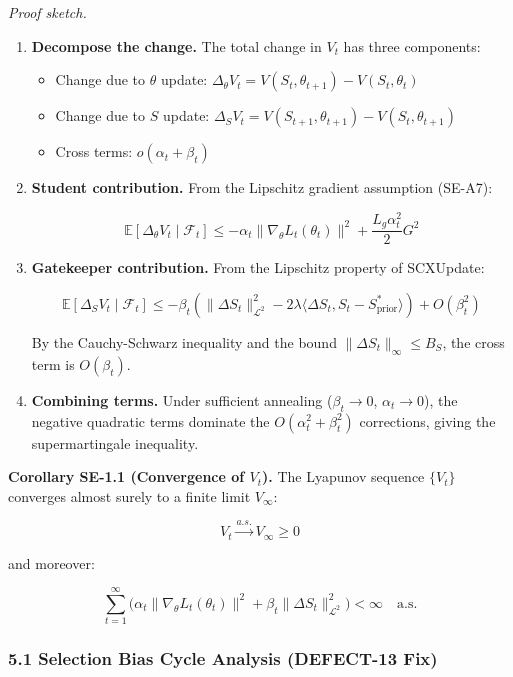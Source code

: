 \documentclass[
  12pt,
]{article}
\providecommand{\tightlist}{%
  \setlength{\itemsep}{0pt}\setlength{\parskip}{0pt}}
\begin{document}
\emph{Proof sketch.}

\begin{enumerate}
\def\labelenumi{\arabic{enumi}.}
\item
  \textbf{Decompose the change.} The total change in \(V_t\) has three
  components:

  \begin{itemize}
  \tightlist
  \item
    Change due to \(\theta\) update:
    \(\Delta_\theta V_t = V(S_t, \theta_{t+1}) - V(S_t, \theta_t)\)
  \item
    Change due to \(S\) update:
    \(\Delta_S V_t = V(S_{t+1}, \theta_{t+1}) - V(S_t, \theta_{t+1})\)
  \item
    Cross terms: \(o(\alpha_t + \beta_t)\)
  \end{itemize}
\item
  \textbf{Student contribution.} From the Lipschitz gradient assumption
  (SE-A7):

  \[
  \mathbb{E}[\Delta_\theta V_t \mid \mathcal{F}_t] \leq -\alpha_t \|\nabla_\theta L_t(\theta_t)\|^2 + \frac{L_g \alpha_t^2}{2} G^2
  \]
\item
  \textbf{Gatekeeper contribution.} From the Lipschitz property of
  SCXUpdate:

  \[
  \mathbb{E}[\Delta_S V_t \mid \mathcal{F}_t] \leq -\beta_t \left( \|\Delta S_t\|^2_{\mathcal{L}^2} - 2\lambda \langle \Delta S_t, S_t - S^*_{\text{prior}} \rangle \right) + O(\beta_t^2)
  \]

  By the Cauchy-Schwarz inequality and the bound
  \(\|\Delta S_t\|_\infty \leq B_S\), the cross term is \(O(\beta_t)\).
\item
  \textbf{Combining terms.} Under sufficient annealing
  (\(\beta_t \to 0\), \(\alpha_t \to 0\)), the negative quadratic terms
  dominate the \(O(\alpha_t^2 + \beta_t^2)\) corrections, giving the
  supermartingale inequality.
\end{enumerate}

\textbf{Corollary SE-1.1 (Convergence of \(V_t\)).} The Lyapunov
sequence \(\{V_t\}\) converges almost surely to a finite limit
\(V_\infty\):

\[
V_t \xrightarrow{a.s.} V_\infty \geq 0
\]

and moreover:

\[
\sum_{t=1}^\infty \bigl( \alpha_t \|\nabla_\theta L_t(\theta_t)\|^2 + \beta_t \|\Delta S_t\|^2_{\mathcal{L}^2} \bigr) < \infty \quad \text{a.s.}
\]

\subsubsection{5.1 Selection Bias Cycle Analysis (DEFECT-13
Fix)}\label{selection-bias-cycle-analysis-defect-13-fix}
\end{document}
